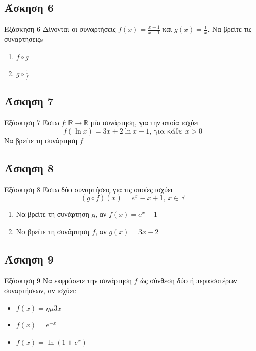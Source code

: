 \documentclass[greek]{beamer}
\begin{document}
\subsection{Άσκηση 6}
\begin{frame}[label=Άσκηση6,t]{Εξάσκηση 6}
      Δίνονται οι συναρτήσεις $f(x)=\frac{x+1}{x-1}$ και $g(x)=\frac{1}{x}$. Να βρείτε τις συναρτήσειςs
      \begin{enumerate}
            \item<1-> $f\circ g$
            \item<2-> $g\circ \frac{1}{f}$
      \end{enumerate}

\end{frame}

\subsection{Άσκηση 7}
\begin{frame}[label=Άσκηση7,t]{Εξάσκηση 7}
      Έστω $f:\mathbb{R}\to\mathbb{R}$ μία συνάρτηση, για την οποία ισχύει
      $$f(\ln x)=3x+2\ln x -1\text{, για κάθε } x>0$$
      Να βρείτε τη συνάρτηση $f$

\end{frame}

\subsection{Άσκηση 8}
\begin{frame}[label=Άσκηση8,t]{Εξάσκηση 8}
      Έστω δύο συναρτήσεις για τις οποίες ισχύει
      $$(g\circ f)(x)=e^x-x+1\text{, } x\in\mathbb{R}$$
      \begin{enumerate}
            \item<1-> Να βρείτε τη συνάρτηση $g$, αν $f(x)=e^x-1$
            \item<2-> Να βρείτε τη συνάρτηση $f$, αν $g(x)=3x-2$
      \end{enumerate}

\end{frame}

\subsection{Άσκηση 9}
\begin{frame}[label=Άσκηση9,t]{Εξάσκηση 9}
      Να εκφράσετε την συνάρτηση $f$ ώς σύνθεση δύο ή περισσοτέρων συναρτήσεων, αν ισχύει:
      \begin{itemize}
            \item $f(x)=ημ 3x$
            \item $f(x)=e^{-x}$
            \item $f(x)=\ln (1+e^x)$
      \end{itemize}

\end{frame}
\end{document}
